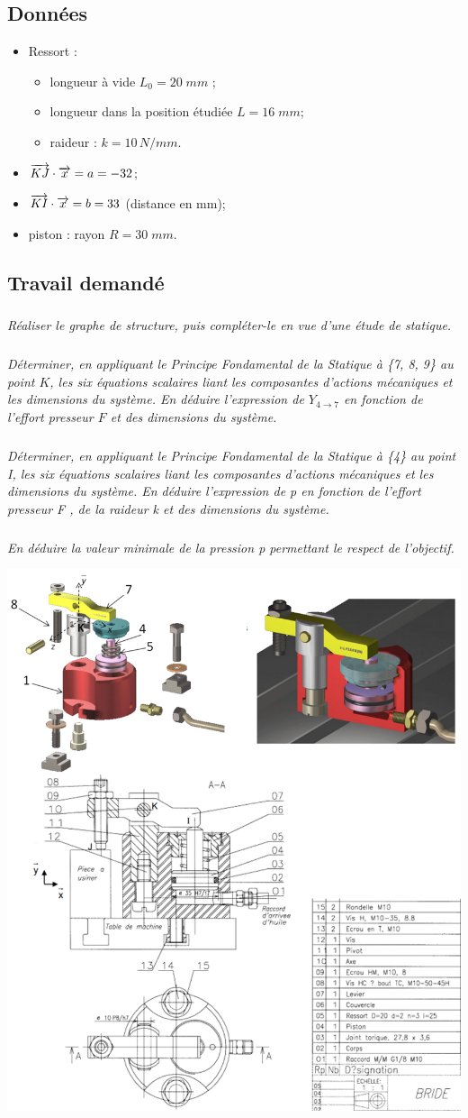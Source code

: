 \documentclass[10pt]{article}
\begin{document}
 \subsection*{Données}
\begin{itemize}
\item Ressort : 
\begin{itemize}
\item longueur à vide $L_0 = 20\; mm$ ; 
\item longueur dans la position étudiée $L = 16\; mm$; 
\item raideur : $k=10\, N/mm$.
\end{itemize}
\item $\overrightarrow{KJ}\cdot\overrightarrow{x}=a=-32$;
\item $\overrightarrow{KI}\cdot\overrightarrow{x}=b= 33$ (distance en mm);
\item piston : rayon $R=30\; mm$.\
\end{itemize}
   \subsection*{Travail demandé}
  \subparagraph{}
 \textit{}
 
   \subparagraph{}
 \textit{Réaliser le graphe de structure, puis compléter-le en vue d’une étude de statique. }
   \subparagraph{}
 \textit{Déterminer, en appliquant le Principe Fondamental de la Statique à \{7, 8, 9\} au point $K$, les 
six équations scalaires liant les composantes d’actions mécaniques et les dimensions du 
système. En déduire l’expression de $Y_{4\rightarrow 7}$ en fonction de l'effort presseur $F$ et des dimensions du système.}
 
   \subparagraph{}
 \textit{Déterminer, en appliquant le Principe Fondamental de la Statique à \{4\} au point I, les six 
équations scalaires liant les composantes d’actions mécaniques et les dimensions du 
système. En déduire l’expression de p en fonction de l’effort presseur F , de la raideur 
k et 
des dimensions du système. 
}
   \subparagraph{}
 \textit{En déduire la valeur minimale de la pression 
p permettant le respect de l'objectif.}


\begin{center}
\includegraphics[width=.9\textwidth]{images/Fi01}
\end{center}
\end{document}

